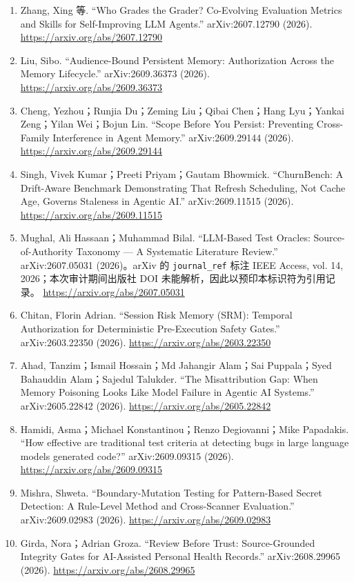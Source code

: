 \documentclass[UTF8,11pt]{ctexart}
\begin{document}
\begin{enumerate}[leftmargin=*,nosep]
\item Zhang, Xing 等. ``Who Grades the Grader? Co-Evolving Evaluation Metrics and Skills for Self-Improving LLM Agents.'' arXiv:2607.12790 (2026). \url{https://arxiv.org/abs/2607.12790}
\item Liu, Sibo. ``Audience-Bound Persistent Memory: Authorization Across the Memory Lifecycle.'' arXiv:2609.36373 (2026). \url{https://arxiv.org/abs/2609.36373}
\item Cheng, Yezhou；Runjia Du；Zeming Liu；Qibai Chen；Hang Lyu；Yankai Zeng；Yilan Wei；Bojun Lin. ``Scope Before You Persist: Preventing Cross-Family Interference in Agent Memory.'' arXiv:2609.29144 (2026). \url{https://arxiv.org/abs/2609.29144}
\item Singh, Vivek Kumar；Preeti Priyam；Gautam Bhowmick. ``ChurnBench: A Drift-Aware Benchmark Demonstrating That Refresh Scheduling, Not Cache Age, Governs Staleness in Agentic AI.'' arXiv:2609.11515 (2026). \url{https://arxiv.org/abs/2609.11515}
\item Mughal, Ali Hassaan；Muhammad Bilal. ``LLM-Based Test Oracles: Source-of-Authority Taxonomy --- A Systematic Literature Review.'' arXiv:2607.05031 (2026)。arXiv 的 \texttt{journal\_ref} 标注 IEEE Access, vol. 14, 2026；本次审计期间出版社 DOI 未能解析，因此以预印本标识符为引用记录。 \url{https://arxiv.org/abs/2607.05031}
\item Chitan, Florin Adrian. ``Session Risk Memory (SRM): Temporal Authorization for Deterministic Pre-Execution Safety Gates.'' arXiv:2603.22350 (2026). \url{https://arxiv.org/abs/2603.22350}
\item Ahad, Tanzim；Ismail Hossain；Md Jahangir Alam；Sai Puppala；Syed Bahauddin Alam；Sajedul Talukder. ``The Misattribution Gap: When Memory Poisoning Looks Like Model Failure in Agentic AI Systems.'' arXiv:2605.22842 (2026). \url{https://arxiv.org/abs/2605.22842}
\item Hamidi, Asma；Michael Konstantinou；Renzo Degiovanni；Mike Papadakis. ``How effective are traditional test criteria at detecting bugs in large language models generated code?'' arXiv:2609.09315 (2026). \url{https://arxiv.org/abs/2609.09315}
\item Mishra, Shweta. ``Boundary-Mutation Testing for Pattern-Based Secret Detection: A Rule-Level Method and Cross-Scanner Evaluation.'' arXiv:2609.02983 (2026). \url{https://arxiv.org/abs/2609.02983}
\item Girda, Nora；Adrian Groza. ``Review Before Trust: Source-Grounded Integrity Gates for AI-Assisted Personal Health Records.'' arXiv:2608.29965 (2026). \url{https://arxiv.org/abs/2608.29965}

\end{enumerate}
\end{document}
